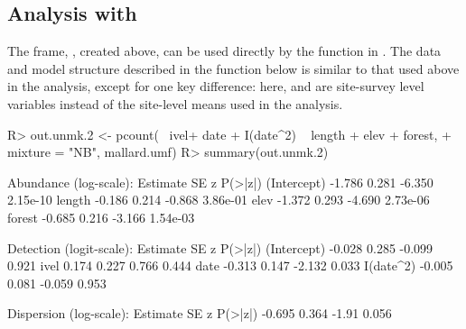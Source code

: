 \documentclass[codesnippet]{jss}
\begin{document}
\subsection[Analysis with unmarked]{Analysis with }
The  frame, , created above, can be used directly by the  function in . The data and model structure described in the  function below is similar to that used above in the  analysis, except for one key difference: here,  and  are site-survey level variables instead of the site-level means used in the  analysis.

\begin{CodeInput}
R> out.unmk.2 <- pcount(~ ivel+ date + I(date^2) ~ length + elev + forest,
+    mixture = "NB", mallard.umf)
R> summary(out.unmk.2)
\end{CodeInput}
\begin{CodeOutput}
Abundance (log-scale):
             Estimate         SE           z     P(>|z|)
(Intercept)    -1.786      0.281      -6.350    2.15e-10
length         -0.186      0.214      -0.868    3.86e-01
elev           -1.372      0.293      -4.690    2.73e-06
forest         -0.685      0.216      -3.166    1.54e-03

Detection (logit-scale):
             Estimate         SE           z     P(>|z|)
(Intercept)    -0.028      0.285      -0.099       0.921
ivel            0.174      0.227       0.766       0.444
date           -0.313      0.147      -2.132       0.033
I(date^2)      -0.005      0.081      -0.059       0.953

Dispersion (log-scale):
Estimate          SE       z    P(>|z|)
-0.695         0.364   -1.91      0.056
\end{CodeOutput}
\end{document}
